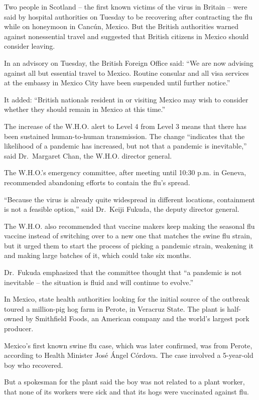 \documentclass[12pt,a4paper,onecolumn]{article}
\begin{document}
Two people in Scotland -- the first known victims of the virus in Britain -- were said by hospital
authorities on Tuesday to be recovering after contracting the flu while on honeymoon in Cancún,
Mexico. But the British authorities warned against nonessential travel and suggested that British
citizens in Mexico should consider leaving.

In an advisory on Tuesday, the British Foreign Office said: ``We are now advising against all but
essential travel to Mexico. Routine consular and all visa services at the embassy in Mexico City
have been suspended until further notice.''

It added: ``British nationals resident in or visiting Mexico may wish to consider whether they
should remain in Mexico at this time.''

The increase of the W.H.O. alert to Level 4 from Level 3 means that there has been sustained
human-to-human transmission. The change ``indicates that the likelihood of a pandemic has increased,
but not that a pandemic is inevitable,'' said Dr.~Margaret Chan, the W.H.O. director general.

The W.H.O.'s emergency committee, after meeting until 10:30 p.m. in Geneva, recommended abandoning
efforts to contain the flu's spread.

``Because the virus is already quite widespread in different locations, containment is not a
feasible option,'' said Dr.~Keiji Fukuda, the deputy director general.

The W.H.O. also recommended that vaccine makers keep making the seasonal flu vaccine instead of
switching over to a new one that matches the swine flu strain, but it urged them to start the
process of picking a pandemic strain, weakening it and making large batches of it, which could take
six months.

Dr.~Fukuda emphasized that the committee thought that ``a pandemic is not inevitable -- the
situation is fluid and will continue to evolve.''

In Mexico, state health authorities looking for the initial source of the outbreak toured a
million-pig hog farm in Perote, in Veracruz State. The plant is half-owned by Smithfield Foods, an
American company and the world's largest pork producer.

Mexico's first known swine flu case, which was later confirmed, was from Perote, according to Health
Minister Jos\'e \'Angel C\'ordova. The case involved a 5-year-old boy who recovered.

But a spokesman for the plant said the boy was not related to a plant worker, that none of its
workers were sick and that its hogs were vaccinated against flu.
\end{document}
